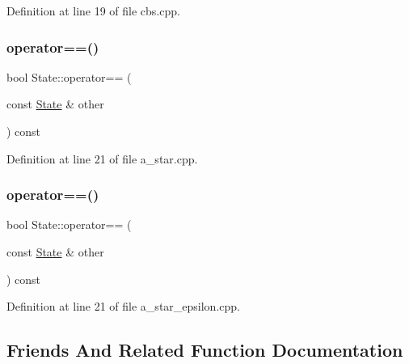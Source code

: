 Definition at line 19 of file cbs.\+cpp.

\mbox{\label{struct_state_ab98d310aaceb21737346521c5bc6fc6c}} 
\subsubsection{\texorpdfstring{operator==()}{operator==()}\hspace{0.1cm}{\footnotesize\ttfamily [3/4]}}
{\footnotesize\ttfamily bool State\+::operator== (\begin{DoxyParamCaption}\item[{const \hyperlink{struct_state}{State} \&}]{other }\end{DoxyParamCaption}) const\hspace{0.3cm}{\ttfamily [inline]}}



Definition at line 21 of file a\+\_\+star.\+cpp.

\mbox{\label{struct_state_ab98d310aaceb21737346521c5bc6fc6c}} 
\subsubsection{\texorpdfstring{operator==()}{operator==()}\hspace{0.1cm}{\footnotesize\ttfamily [4/4]}}
{\footnotesize\ttfamily bool State\+::operator== (\begin{DoxyParamCaption}\item[{const \hyperlink{struct_state}{State} \&}]{other }\end{DoxyParamCaption}) const\hspace{0.3cm}{\ttfamily [inline]}}



Definition at line 21 of file a\+\_\+star\+\_\+epsilon.\+cpp.



\subsection{Friends And Related Function Documentation}
\mbox{\label{struct_state_a5604754e63c801276d20313c05a68847}} 
